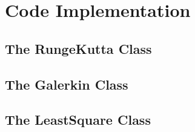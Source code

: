 \section{Code Implementation}\label{sec:code_implementation}

\subsection{The RungeKutta Class}\label{subsec:rungekutta_class}

\subsection{The Galerkin Class}\label{subsec:galerkin_class}

\subsection{The LeastSquare Class}\label{subsec:leastsquares_class}